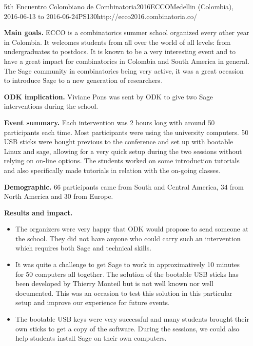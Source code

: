 \begin{event}{5th Encuentro Colombiano de Combinatoria}{2016ECCO}{Medellin (Colombia), 2016-06-13 to 2016-06-24}{PS}{130}{http://ecco2016.combinatoria.co/}

\textbf{Main goals.} ECCO is a combinatorics summer school organized every other year in Colombia. It welcomes 
students from all over the world of all levels: from undergraduates to postdocs. It is known to be a very
interesting event and to have a great impact for combinatorics in Colombia and South America in general.
The Sage community in combinatorics being very active, it was a great occasion to introduce Sage
to a new generation of researchers.

\textbf{ODK implication.} Viviane Pons was sent by ODK to give two Sage interventions
during the school.

\textbf{Event summary.} Each intervention was 2 hours long with around 50 participants each time.
Most participants were using the university computers. 50 USB sticks were bought previous
to the conference and set up with bootable Linux and sage, allowing for a very quick setup
during the two sessions without relying on on-line options. The students worked on some
introduction tutorials and also specifically made tutorials in relation with the on-going
classes.  

\textbf{Demographic.} 66 participants came from South and Central America, 34 from North America
and 30 from Europe. 

\textbf{Results and impact.} 
\begin{itemize}
\item The organizers were very happy that ODK would propose to send someone at the school. 
They did not have anyone who could carry such an intervention which requires both Sage and
technical skills.

\item It was quite a challenge to get Sage to work in approximatively 10 minutes for 50
computers all together. The solution of the bootable USB sticks has been developed by Thierry
Monteil but is not well known nor well documented. This was an occasion to test this solution
in this particular setup and improve our experience for future events.

\item The bootable USB keys were very successful and many students brought their own sticks to
get a copy of the software. During the sessions, we could also help students install
Sage on their own computers.


\end{itemize}
\end{event}

